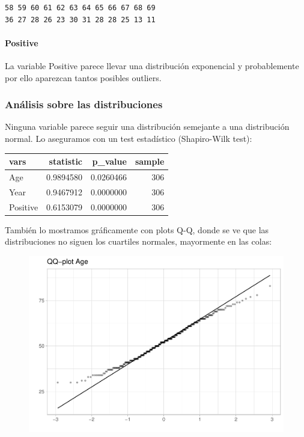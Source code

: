 \begin{verbatim}
58 59 60 61 62 63 64 65 66 67 68 69 
36 27 28 26 23 30 31 28 28 25 13 11 
\end{verbatim}


\paragraph{Positive}
La variable Positive parece llevar una distribución exponencial y probablemente por ello aparezcan tantos posibles outliers.

\subsubsection{Análisis sobre las distribuciones}

Ninguna variable parece seguir una distribución semejante a una distribución normal. Lo aseguramos con un test estadístico (Shapiro-Wilk test):
\vspace{\baselineskip}

\begin{tabular}{l|r|r|r}
\hline
vars & statistic & p\_value & sample\\
\hline
Age & 0.9894580 & 0.0260466 & 306\\
\hline
Year & 0.9467912 & 0.0000000 & 306\\
\hline
Positive & 0.6153079 & 0.0000000 & 306\\
\hline
\end{tabular}

\vspace{\baselineskip}

También lo mostramos gráficamente con plots Q-Q, donde se ve que las distribuciones no siguen los cuartiles normales, mayormente en las colas:
\begin{figure}[H]\includegraphics[width=.9\linewidth]{img/EDA2_files/figure-latex/unnamed-chunk-18-1} \end{figure}

